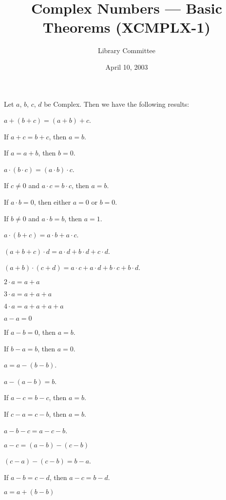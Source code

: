 \documentclass{article}
\title{Complex Numbers --- Basic Theorems (XCMPLX-1)}
\author{Library Committee}
\date{April 10, 2003}
\begin{document}
\maketitle

Let $a$, $b$, $c$, $d$ be Complex. Then we have the following results:
\begin{thm}
\item\label{xcmplx1:1} $a+(b+c)=(a+b)+c$.
\item\label{xcmplx1:2} If $a+c=b+c$, then $a=b$.
\item\label{xcmplx1:3} If $a=a+b$, then $b=0$.
\item\label{xcmplx1:4} $a\cdot(b\cdot c)=(a\cdot b)\cdot c$.
  \bigbreak
\item\label{xcmplx1:5} If $c\neq0$ and $a\cdot c=b\cdot c$, then $a=b$.
\item\label{xcmplx1:6} If $a\cdot b=0$, then either $a=0$ or $b=0$.
\item\label{xcmplx1:7} If $b\neq0$ and $a\cdot b=b$, then $a=1$.
  \bigbreak
\item\label{xcmplx1:8} $a\cdot(b+c)=a\cdot b+a\cdot c$.
\item\label{xcmplx1:9} $(a+b+c)\cdot d=a\cdot d+b\cdot d+c\cdot d$.
\item\label{xcmplx1:10} $(a+b)\cdot(c+d)=a\cdot c+a\cdot d+b\cdot c+b\cdot d$.
\item\label{xcmplx1:11} $2\cdot a=a+a$
\item\label{xcmplx1:12} $3\cdot a=a+a+a$
\item\label{xcmplx1:13} $4\cdot a=a+a+a+a$
  \bigbreak
\item\label{xcmplx1:14} $a-a=0$
\item\label{xcmplx1:15} If $a-b=0$, then $a=b$.
\item\label{xcmplx1:16} If $b-a=b$, then $a=0$.
  \bigbreak
\item\label{xcmplx1:17} $a=a-(b-b)$.
\item\label{xcmplx1:18} $a-(a-b)=b$.
\item\label{xcmplx1:19} If $a-c=b-c$, then $a=b$.
\item\label{xcmplx1:20} If $c-a=c-b$, then $a=b$.
\item\label{xcmplx1:21} $a-b-c=a-c-b$.
\item\label{xcmplx1:22} $a-c=(a-b)-(c-b)$
\item\label{xcmplx1:23} $(c-a)-(c-b)=b-a$.
\item\label{xcmplx1:24} If $a-b=c-d$, then $a-c=b-d$.
  \bigbreak
\item\label{xcmplx1:25} $a=a+(b-b)$

\end{thm}
\end{document}
